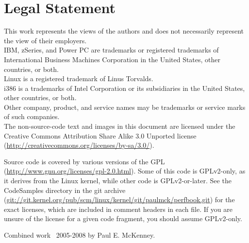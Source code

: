 
\section*{Legal Statement}

{ \small
This work represents the views of the authors and does not necessarily
represent the view of their employers.\\
IBM, zSeries, and Power PC are trademarks or registered trademarks of
International Business Machines Corporation in the United States,
other countries, or both.\\
Linux is a registered trademark of Linus Torvalds.\\
i386 is a trademarks of Intel Corporation or its
subsidiaries in the United States, other countries, or both. \\
Other company, product, and service names may be trademarks or service marks
of such companies.\\

The non-source-code text and images in this document are licensed under
the Creative Commons Attribution Share Alike 3.0 Unported license
(\url{http://creativecommons.org/licenses/by-sa/3.0/}).

Source code is covered by various versions of the GPL
(\url{http://www.gnu.org/licenses/gpl-2.0.html}).
Some of this code is GPLv2-only, as it derives from the Linux kernel,
while other code is GPLv2-or-later.
See the CodeSamples directory in the git archive
(\url{git://git.kernel.org/pub/scm/linux/kernel/git/paulmck/perfbook.git})
for the exact licenses, which are included in comment headers in each file.
If you are unsure of the license for a given code fragment,
you should assume GPLv2-only.

Combined work {\textcopyright}~2005-2008 by Paul E. McKenney.
}
